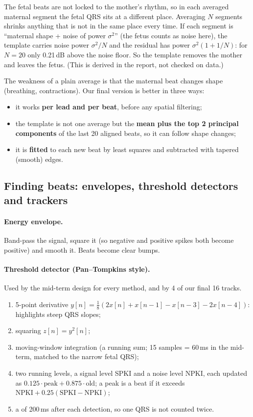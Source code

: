 \documentclass[11pt]{article}
\begin{document}
\begin{simple}
The fetal beats are not locked to the mother's rhythm, so in each averaged maternal segment the fetal QRS sits at a different place. Averaging $N$ segments shrinks anything that is not in the same place every time. If each segment is ``maternal shape + noise of power $\sigma^2$'' (the fetus counts as noise here), the template carries noise power $\sigma^2/N$ and the residual has power $\sigma^2(1 + 1/N)$: for $N = 20$ only 0.21\,dB above the noise floor. So the template removes the mother and leaves the fetus. (This is derived in the report, not checked on data.)
\end{simple}

The weakness of a plain average is that the maternal beat changes shape (breathing, contractions). Our final version is better in three ways:
\begin{itemize}
  \item it works \textbf{per lead and per beat}, before any spatial filtering;
  \item the template is not one average but the \textbf{mean plus the top 2 principal components} of the last 20 aligned beats, so it can follow shape changes;
  \item it is \textbf{fitted} to each new beat by least squares and subtracted with tapered (smooth) edges.
\end{itemize}

\subsection{Finding beats: envelopes, threshold detectors and trackers}
\label{sec:detectors}
\paragraph{Energy envelope.} Band-pass the signal, square it (so negative and positive spikes both become positive) and smooth it. Beats become clear bumps.

\paragraph{Threshold detector (Pan--Tompkins style).} Used by the mid-term design for every method, and by 4 of our final 16 tracks.
\begin{enumerate}
  \item 5-point derivative $y[n] = \tfrac18(2x[n] + x[n-1] - x[n-3] - 2x[n-4])$: highlights steep QRS slopes;
  \item squaring $z[n] = y^2[n]$;
  \item moving-window integration (a running sum; 15 samples = 60\,ms in the mid-term, matched to the narrow fetal QRS);
  \item two running levels, a signal level SPKI and a noise level NPKI, each updated as $0.125\cdot\text{peak} + 0.875\cdot\text{old}$; a peak is a beat if it exceeds $\text{NPKI} + 0.25(\text{SPKI} - \text{NPKI})$;
  \item a  of 200\,ms after each detection, so one QRS is not counted twice.
\end{enumerate}
\end{document}
